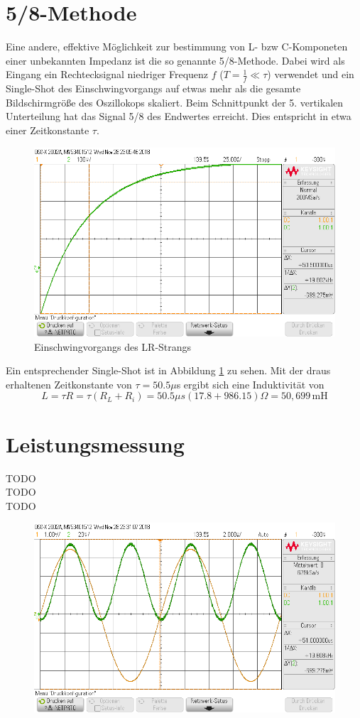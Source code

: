 \section{5/8-Methode}
Eine andere, effektive Möglichkeit zur bestimmung von L- bzw C-Komponeten einer unbekannten Impedanz ist die so genannte 5/8-Methode. Dabei wird als Eingang ein Rechtecksignal niedriger Frequenz $f$ ($T = \frac{1}{f} \ll \tau$) verwendet und ein Single-Shot des Einschwingvorgangs auf etwas mehr als die gesamte Bildschirmgröße des Oszillokops skaliert. Beim Schnittpunkt der 5. vertikalen Unterteilung hat das Signal 5/8 des Endwertes erreicht. Dies entspricht in etwa einer Zeitkonstante $\tau$. \\
\begin{figure}[h]
	\includegraphics[width=\textwidth]{./img/ch2/58_methode.png}
	\centering
	\caption{Einschwingvorgangs des LR-Strangs}
	\label{fig:rl_einschwing}
\end{figure} \noindent
Ein entsprechender Single-Shot ist in Abbildung \ref{fig:rl_einschwing} zu sehen. Mit der draus erhaltenen Zeitkonstante von $\tau = 50.5 \mu$s ergibt sich eine Induktivität von
\begin{equation}
	L = \tau R = \tau (R_L + R_i) = 50.5 \mu s (17.8 + 986.15) \Omega = 50,699\,\text{mH}
\end{equation}
\section{Leistungsmessung}
TODO \\
TODO \\
TODO \\
\begin{figure}[h]
	\includegraphics[width=\textwidth]{./img/ch2/leistung.png}
	\centering
	\label{XXXXX}
\end{figure}